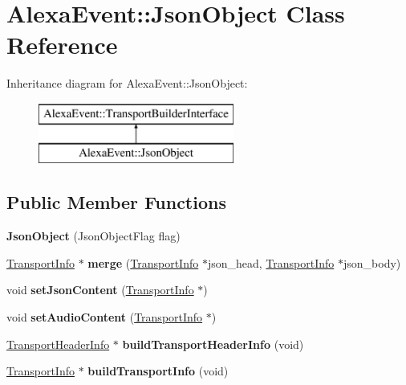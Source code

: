 \hypertarget{classAlexaEvent_1_1JsonObject}{}\section{Alexa\+Event\+:\+:Json\+Object Class Reference}
\label{classAlexaEvent_1_1JsonObject}
Inheritance diagram for Alexa\+Event\+:\+:Json\+Object\+:\begin{figure}[H]
\begin{center}
\leavevmode
\includegraphics[height=2.000000cm]{dd/d7e/classAlexaEvent_1_1JsonObject}
\end{center}
\end{figure}
\subsection*{Public Member Functions}
\begin{DoxyCompactItemize}
\item 
\mbox{\label{classAlexaEvent_1_1JsonObject_a4daf595fdecc380cb6cab8107a5492cd}} 
{\bfseries Json\+Object} (Json\+Object\+Flag flag)
\item 
\mbox{\label{classAlexaEvent_1_1JsonObject_a918db257b4b5ea594437b5be2aeccace}} 
\hyperlink{classAlexaEvent_1_1TransportInfo}{Transport\+Info} $\ast$ {\bfseries merge} (\hyperlink{classAlexaEvent_1_1TransportInfo}{Transport\+Info} $\ast$json\+\_\+head, \hyperlink{classAlexaEvent_1_1TransportInfo}{Transport\+Info} $\ast$json\+\_\+body)
\item 
\mbox{\label{classAlexaEvent_1_1JsonObject_aaf9bf9ac1a4e365daaf70d9f8d3930ef}} 
void {\bfseries set\+Json\+Content} (\hyperlink{classAlexaEvent_1_1TransportInfo}{Transport\+Info} $\ast$)
\item 
\mbox{\label{classAlexaEvent_1_1JsonObject_a9f04ef2417353dcf36978059b6f31484}} 
void {\bfseries set\+Audio\+Content} (\hyperlink{classAlexaEvent_1_1TransportInfo}{Transport\+Info} $\ast$)
\item 
\mbox{\label{classAlexaEvent_1_1JsonObject_aae3a4ac41e09c64e40b701878012efa2}} 
\hyperlink{classAlexaEvent_1_1TransportHeaderInfo}{Transport\+Header\+Info} $\ast$ {\bfseries build\+Transport\+Header\+Info} (void)
\item 
\mbox{\label{classAlexaEvent_1_1JsonObject_a538bd08178321400e3af74364feec755}} 
\hyperlink{classAlexaEvent_1_1TransportInfo}{Transport\+Info} $\ast$ {\bfseries build\+Transport\+Info} (void)
\end{DoxyCompactItemize}


